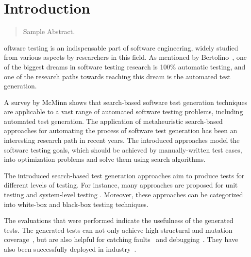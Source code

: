 \chapter{Introduction}
\label{introduction}

\begin{abstract}
Sample Abstract. 
\end{abstract}



\newpage
{}oftware testing is an indispensable part of software engineering, widely studied from various aspects by researchers in this field. As mentioned by Bertolino~\cite{bertolino2007software}, one of the biggest dreams in software testing research is 100\% automatic testing, and one of the research paths towards reaching this dream is the automated test generation.

A survey by McMinn \cite{McMinn2004} shows that search-based software test generation techniques are applicable to a vast range of automated software testing problems, including automated test generation. The application of metaheuristic search-based approaches for automating the process of software test generation has been an interesting research path in recent years. The introduced approaches model the software testing goals, which should be achieved by manually-written test cases, into optimization problems and solve them using search algorithms. 

The introduced search-based test generation approaches aim to produce tests for different levels of testing. For instance, many approaches are proposed for unit testing \cite{Fraser2011, braione2017tardis, braione2018sushi, prasetya2013t3} and system-level testing \cite{Arcuri2019, Holler2012, Padhye2019, beyene2012, coppit2005, godefroid2008}. Moreover, these approaches can be categorized into white-box \cite{Fraser2011, braione2017tardis, braione2018sushi, prasetya2013t3, Arcuri2019} and black-box \cite{Holler2012, Padhye2019, beyene2012, coppit2005, godefroid2008} testing techniques. 

The evaluations that were performed indicate the usefulness of the generated tests. The generated tests can not only achieve high structural and mutation coverage~\cite{Panichella2018a, Fraser2014b}, but are also helpful for catching faults~\cite{Shamshiri2016} and debugging~\cite{Ceccato2015}. They have also been successfully deployed in industry~\cite{Alshahwan2018, almasi2017industrial}.

